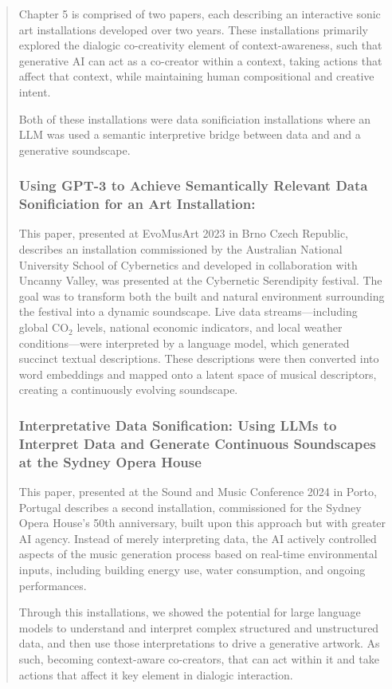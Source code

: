 \begin{quote}
Chapter 5 is comprised of two papers, each describing an interactive sonic art installations developed over two years. These installations primarily explored the dialogic co-creativity element of context-awareness, such that generative AI can act as a co-creator within a context, taking actions that affect that context, while maintaining human compositional and creative intent. 

Both of these installations were data sonificiation installations where an LLM was used a semantic interpretive bridge between data and and a generative soundscape. 

\subsubsection{Using GPT-3 to Achieve Semantically Relevant Data Sonificiation for an Art Installation: } This paper, presented at EvoMusArt 2023 in Brno Czech Republic, describes an installation commissioned by the Australian National University School of Cybernetics and developed in collaboration with Uncanny Valley, was presented at the Cybernetic Serendipity festival. The goal was to transform both the built and natural environment surrounding the festival into a dynamic soundscape. Live data streams—including global CO$_2$ levels, national economic indicators, and local weather conditions—were interpreted by a language model, which generated succinct textual descriptions. These descriptions were then converted into word embeddings and mapped onto a latent space of musical descriptors, creating a continuously evolving soundscape.

\subsubsection{Interpretative Data Sonification: Using LLMs to Interpret Data and Generate Continuous Soundscapes at the Sydney Opera House} This paper, presented at the Sound and Music Conference 2024 in Porto, Portugal describes a second installation, commissioned for the Sydney Opera House’s 50th anniversary, built upon this approach but with greater AI agency. Instead of merely interpreting data, the AI actively controlled aspects of the music generation process based on real-time environmental inputs, including building energy use, water consumption, and ongoing performances.

Through this installations, we showed the potential for large language models to understand and interpret complex structured and unstructured data, and then use those interpretations to drive a generative artwork. As such, becoming context-aware co-creators, that can act within it and take actions that affect it key element in dialogic interaction. 


\end{quote}
